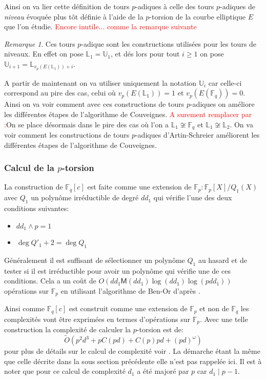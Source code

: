 \documentclass[10pt,a4paper]{book}
\theoremstyle{plain}
\theoremstyle{definition}
\theoremstyle{definition}
\theoremstyle{definition}
\theoremstyle{definition}
\theoremstyle{remark}
\newtheorem{rem}[thm]{Remarque}
\theoremstyle{remark}
\theoremstyle{definition}
\begin{document}
Ainsi on va lier cette définition de tours $p$-adiques à celle des tours $p$-adiques de \emph{niveau} évoquée plus tôt définie à l'aide de la $p$-torsion de la courbe elliptique $E$ que l'on étudie.
\textcolor{red}{Encore inutile... comme la remarque suivante}
\begin{rem}
Ces tours $p$-adique sont les constructions utilisées pour les tours de niveaux.
En effet on pose $\mathbb{L}_1=\mathbb{U}_1$, et dés lors pour tout $i\geqslant 1$ on pose $\mathbb{U}_{i+1}=\mathbb{L}_{v_p(E(\mathbb{L}_1))+i}$.
\end{rem}


A partir de maintenant on va utiliser uniquement la notation $\mathbb{U}_i$ car celle-ci correspond au pire des cas, celui où $v_p(E(\mathbb{L}_1))=1$ et $v_p(E(\mathbb{F}_q))=0$. Ainsi on va voir comment avec ces constructions de tours $p$-adiques on améliore les différentes étapes de l'algorithme de Couveignes.
\textcolor{red}{A surement remplacer par :}On se place désormais dans le pire des cas où l'on a $\mathbb{L}_1 \not \cong \mathbb{F}_q$ et $\mathbb{L}_1 \not \cong \mathbb{L}_2$. On va voir comment les constructions de tours $p$-adiques d'Artin-Schreier améliorent les différentes étapes de l'algorithme de Couveignes.
\subsubsection{Calcul de la $p$-torsion}
La construction de $\mathbb{F}_q[c]$ est faite comme une extension de $\mathbb{F}_p:\mathbb{F}_p[X]/Q_1(X)$ avec $Q_1$ un polynôme irréductible de degré $dd_1$ qui vérifie l'une des deux conditions suivantes:
\begin{itemize}
\item $d d_1 \wedge p =1$
\item $\deg Q'_1+2 = \deg Q_1$
\end{itemize}
Généralement il est suffisant de sélectionner un polynôme $Q_1$ au hasard et de tester si il est irréductible pour avoir un polynôme qui vérifie une de ces conditions. Cela a un coût de $O(dd_1 \mathsf{M}(dd_1)\log(dd_1)\log(pdd_1))$ opérations sur $\mathbb{F}_p$ en utilisant l'algorithme de Ben-Or d'après \cite[Theoreme 14.42]{vzGJG03}.

Ainsi comme $\mathbb{F}_q[c]$ est construit comme une extension de $\mathbb{F}_p$ et non de $\mathbb{F}_q$ les complexités vont être exprimées en termes d'opérations sur $\mathbb{F}_p$. Avec une telle construction la complexité de calculer la $p$-torsion est de: 
\begin{equation*}
\tilde{O}(p^2d^3+pC(pd)+C(p)pd+(pd)^{\omega})
\end{equation*}
pour plus de détails sur le calcul de complexité voir \cite{DeFeo11}. La démarche étant la même que celle décrite dans la sous section précédente elle n'est pas rappelée ici. Il est à noter que pour ce calcul de complexité $d_1$ a été majoré par $p$ car $d_1 \mid p-1$. 
\end{document}
